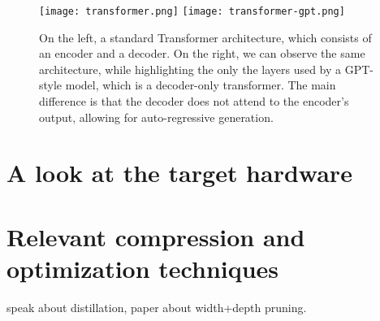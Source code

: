 \begin{figure}[htbp]
    \centering
    \texttt{[image: transformer.png]}
    \hfill
    \texttt{[image: transformer-gpt.png]}
    \caption{On the left, a standard Transformer architecture, which consists of an encoder and a decoder. On the right, we can observe the same architecture, while highlighting the only the layers used by a GPT-style model, which is a decoder-only transformer. The main difference is that the decoder does not attend to the encoder's output, allowing for auto-regressive generation.}
    \label{fig:sidebyside}
\end{figure}

\section{A look at the target hardware} \label{target_hardware}

\section{Relevant compression and optimization techniques}
speak about distillation, paper about width+depth pruning.


